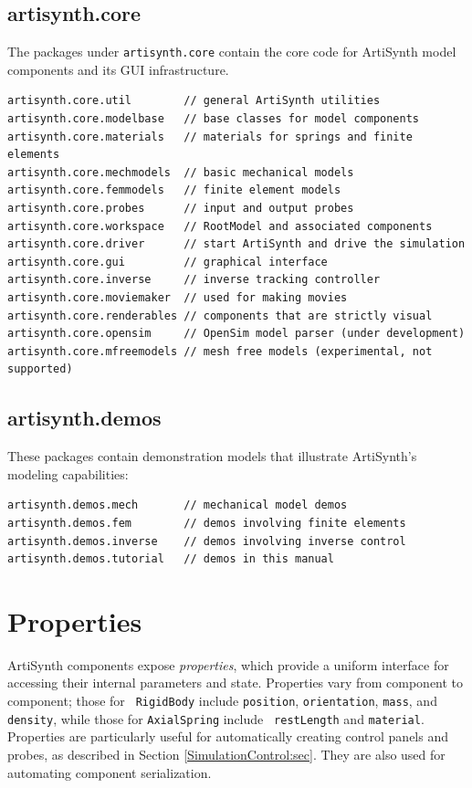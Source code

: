 \subsection{artisynth.core}

The packages under {\tt artisynth.core} contain the core code for
ArtiSynth model components and its GUI infrastructure.

\begin{lstlisting}[]
artisynth.core.util        // general ArtiSynth utilities
artisynth.core.modelbase   // base classes for model components
artisynth.core.materials   // materials for springs and finite elements
artisynth.core.mechmodels  // basic mechanical models
artisynth.core.femmodels   // finite element models
artisynth.core.probes      // input and output probes
artisynth.core.workspace   // RootModel and associated components
artisynth.core.driver      // start ArtiSynth and drive the simulation
artisynth.core.gui         // graphical interface
artisynth.core.inverse     // inverse tracking controller
artisynth.core.moviemaker  // used for making movies
artisynth.core.renderables // components that are strictly visual
artisynth.core.opensim     // OpenSim model parser (under development)
artisynth.core.mfreemodels // mesh free models (experimental, not supported)
\end{lstlisting}

\subsection{artisynth.demos}

These packages contain demonstration models that illustrate
ArtiSynth's modeling capabilities:

\begin{lstlisting}[]
artisynth.demos.mech       // mechanical model demos
artisynth.demos.fem        // demos involving finite elements
artisynth.demos.inverse    // demos involving inverse control
artisynth.demos.tutorial   // demos in this manual
\end{lstlisting}

\section{Properties}
\label{Properties:sec}

ArtiSynth components expose {\it properties}, which provide a uniform
interface for accessing their internal parameters and
state. Properties vary from component to component; those for {\tt
RigidBody} include {\tt position}, {\tt orientation}, {\tt mass}, and
{\tt density}, while those for {\tt AxialSpring} include {\tt
restLength} and {\tt material}. Properties are particularly
useful for automatically creating control panels and
probes, as described in Section \ref{SimulationControl:sec}.
They are also used for automating component serialization.

